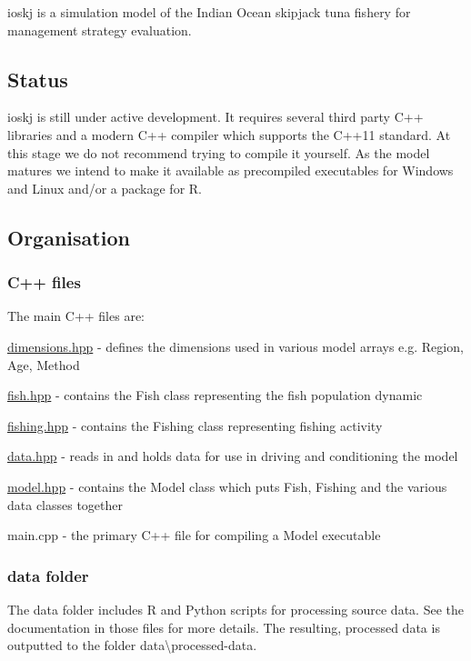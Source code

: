 {\ttfamily ioskj} is a simulation model of the Indian Ocean skipjack tuna fishery for management strategy evaluation.

\subsection*{Status}

{\ttfamily ioskj} is still under active development. It requires several third party C++ libraries and a modern C++ compiler which supports the C++11 standard. At this stage we do not recommend trying to compile it yourself. As the model matures we intend to make it available as precompiled executables for Windows and Linux and/or a package for R.

\subsection*{Organisation}

\subsubsection*{C++ files}

The main C++ files are\-:


\begin{DoxyItemize}
\item {\ttfamily \hyperlink{dimensions_8hpp_source}{dimensions.\-hpp}} -\/ defines the dimensions used in various model arrays e.\-g. {\ttfamily Region}, {\ttfamily Age}, {\ttfamily Method}
\item {\ttfamily \hyperlink{fish_8hpp_source}{fish.\-hpp}} -\/ contains the {\ttfamily Fish} class representing the fish population dynamic
\item {\ttfamily \hyperlink{fishing_8hpp_source}{fishing.\-hpp}} -\/ contains the {\ttfamily Fishing} class representing fishing activity
\item {\ttfamily \hyperlink{data_8hpp_source}{data.\-hpp}} -\/ reads in and holds data for use in driving and conditioning the model
\item {\ttfamily \hyperlink{model_8hpp_source}{model.\-hpp}} -\/ contains the {\ttfamily Model} class which puts {\ttfamily Fish}, {\ttfamily Fishing} and the various data classes together
\item {\ttfamily main.\-cpp} -\/ the primary C++ file for compiling a {\ttfamily Model} executable
\end{DoxyItemize}

\subsubsection*{{\ttfamily data} folder}

The {\ttfamily data} folder includes R and Python scripts for processing source data. See the documentation in those files for more details. The resulting, processed data is outputted to the folder {\ttfamily data\textbackslash{}processed-\/data}. 